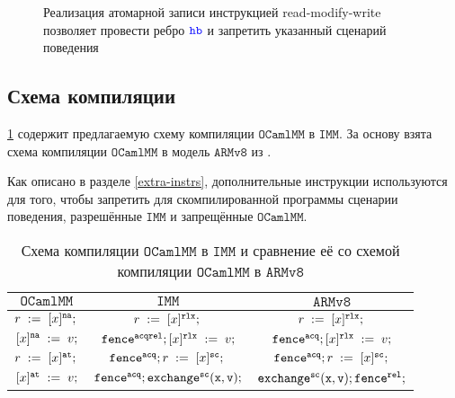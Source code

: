 \documentclass[14pt]{matmex-diploma-custom}
\newcommand{\IMM}{\mathtt{IMM}}
\newcommand{\OMM}{\mathtt{OCaml}\allowbreak \mathtt{MM}}
\begin{document}
\newcommand{\offsetthree}{6}
\begin{figure}[h]
  \centering
  \begin{minipage}{0.9\textwidth}
    \centering
  \end{minipage}
  \caption{Реализация атомарной записи инструкцией read-modify-write позволяет провести ребро $\lHB$ и запретить указанный сценарий поведения}
  \label{fig:rmw-hb}
\end{figure}



\subsection{Схема компиляции}

\cref{table:scheme} содержит предлагаемую схему компиляции $\OMM$ в $\IMM$. За основу взята схема компиляции $\OMM$ в модель $\mathtt{ARMv8}$ из \cite{omm}.

Как описано в разделе \ref{extra-instrs}, дополнительные инструкции используются для того, чтобы запретить для скомпилированной программы сценарии поведения, разрешённые $\IMM$ и запрещённые $\OMM$. 

\begin{table}[h]
  \centering
  \begin{tabular}{ | c | c | c| }
    \hline
    $\OMM$ & $\IMM$ & $\mathtt{ARMv8}$ \\
    \hline
    $\readInst{r}{x}{}{\na}$ & $\readInst{r}{x}{}{\rlx}$ & $\readInst{r}{x}{}{\rlx}$  \\
    $[x]^{{\mathtt{na}}}\;:=\;v;$ & $\mathtt{fence}^{{\mathtt{acqrel}}}; [x]^{\mathtt{rlx}}\;:=\;v;$ & $\mathtt{fence}^{{\mathtt{acq}}};  [x]^{\mathtt{rlx}}\;:=\;v;$\\
    $\readInst{r}{x}{}{\at}$ & $\fenceInst{\acq} \readInst{r}{x}{}{\sco}$ & $\fenceInst{\acq} \readInst{r}{x}{}{\sco}$\\
    $[x]^{{\mathtt{at}}}\;:=\;v;$ & $\mathtt{fence}^{{\mathtt{acq}}}; \mathtt{exchange^{{\mathtt{sc}}}(x, v)};$ & $\mathtt{exchange^{{\mathtt{sc}}}(x, v)}; \mathtt{fence}^{{\mathtt{rel}}};$\\
    \hline
  \end{tabular}
  \caption{Схема компиляции $\OMM$ в $\IMM$ и сравнение её со схемой компиляции $\OMM$ в $\mathtt{ARMv8}$}
  \label{table:scheme}
\end{table}
\end{document}
